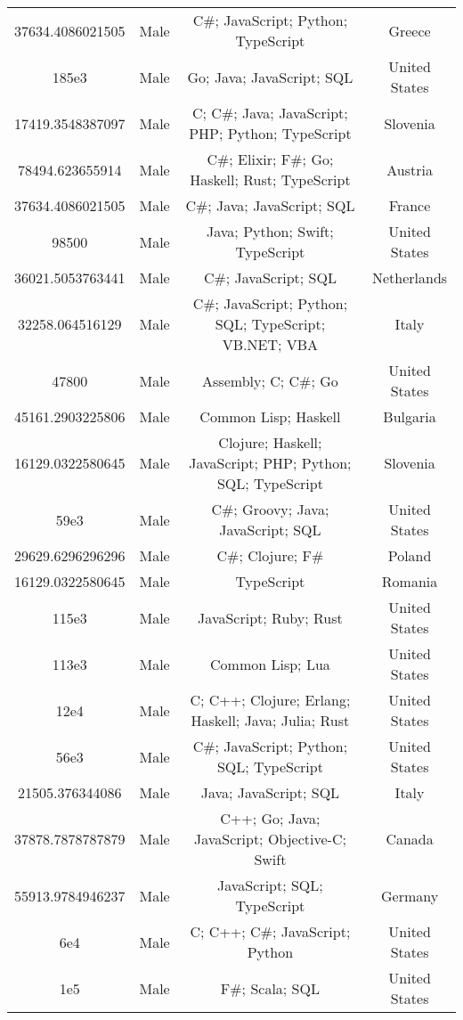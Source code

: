 \begin{center}
\begin{tabular}{ |c|c|c|c| }
37634.4086021505  &  Male  &  C\#; JavaScript; Python; TypeScript  &  Greece  \\ 
185e3  &  Male  &  Go; Java; JavaScript; SQL  &  United States  \\ 
17419.3548387097  &  Male  &  C; C\#; Java; JavaScript; PHP; Python; TypeScript  &  Slovenia  \\ 
78494.623655914  &  Male  &  C\#; Elixir; F\#; Go; Haskell; Rust; TypeScript  &  Austria  \\ 
37634.4086021505  &  Male  &  C\#; Java; JavaScript; SQL  &  France  \\ 
98500  &  Male  &  Java; Python; Swift; TypeScript  &  United States  \\ 
36021.5053763441  &  Male  &  C\#; JavaScript; SQL  &  Netherlands  \\ 
32258.064516129  &  Male  &  C\#; JavaScript; Python; SQL; TypeScript; VB.NET; VBA  &  Italy  \\ 
47800  &  Male  &  Assembly; C; C\#; Go  &  United States  \\ 
45161.2903225806  &  Male  &  Common Lisp; Haskell  &  Bulgaria  \\ 
16129.0322580645  &  Male  &  Clojure; Haskell; JavaScript; PHP; Python; SQL; TypeScript  &  Slovenia  \\ 
59e3  &  Male  &  C\#; Groovy; Java; JavaScript; SQL  &  United States  \\ 
29629.6296296296  &  Male  &  C\#; Clojure; F\#  &  Poland  \\ 
16129.0322580645  &  Male  &  TypeScript  &  Romania  \\ 
115e3  &  Male  &  JavaScript; Ruby; Rust  &  United States  \\ 
113e3  &  Male  &  Common Lisp; Lua  &  United States  \\ 
12e4  &  Male  &  C; C++; Clojure; Erlang; Haskell; Java; Julia; Rust  &  United States  \\ 
56e3  &  Male  &  C\#; JavaScript; Python; SQL; TypeScript  &  United States  \\ 
21505.376344086  &  Male  &  Java; JavaScript; SQL  &  Italy  \\ 
37878.7878787879  &  Male  &  C++; Go; Java; JavaScript; Objective-C; Swift  &  Canada  \\ 
55913.9784946237  &  Male  &  JavaScript; SQL; TypeScript  &  Germany  \\ 
6e4  &  Male  &  C; C++; C\#; JavaScript; Python  &  United States  \\ 
1e5  &  Male  &  F\#; Scala; SQL  &  United States  \\ 

\end{tabular}
\end{center}
